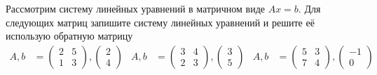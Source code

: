 \begin{exercise}
Рассмотрим систему линейных уравнений в матричном виде \(Ax=b\).
Для следующих матриц запишите систему линейных уравнений и решите её использую обратную матрицу
\begin{align*}
	A,b&=\begin{pmatrix}
		2 & 5 \\ 1 & 3
	\end{pmatrix}, \begin{pmatrix}
		2 \\ 4
	\end{pmatrix} & 
	A,b&=\begin{pmatrix}
		3 & 4 \\ 2 & 3
	\end{pmatrix}, \begin{pmatrix}
		3 \\ 5
	\end{pmatrix} & 
	A,b&=\begin{pmatrix}
		5 & 3 \\ 7 & 4
	\end{pmatrix}, \begin{pmatrix}
		-1 \\ 0
	\end{pmatrix}
\end{align*}
\end{exercise}

